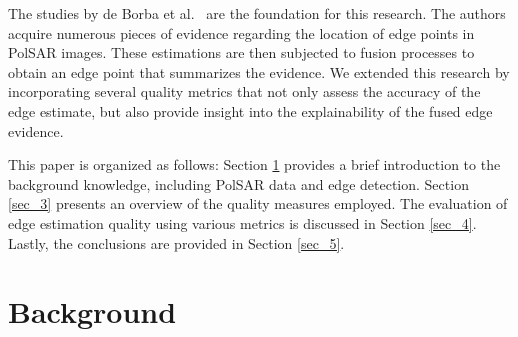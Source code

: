 \documentclass{article}
\begin{document}
The studies by de Borba et al.~\cite{DeBorba2020,FeatureSelectionforEdgeDetectioninPolSARImages} are the foundation for this research. The authors acquire numerous pieces of evidence regarding the location of edge points in PolSAR images. These estimations are then subjected to fusion processes to obtain an edge point that summarizes the evidence.
We extended this research by incorporating several quality metrics that not only assess the accuracy of the edge estimate, but also provide insight into the explainability of the fused edge evidence.

This paper is organized as follows:
Section \ref{sec_2} provides a brief introduction to the background knowledge, including PolSAR data and edge detection. Section \ref{sec_3} presents an overview of the quality measures employed. The evaluation of edge estimation quality using various metrics is discussed in Section \ref{sec_4}. Lastly, the conclusions are provided in Section \ref{sec_5}.


\section{Background}\label{sec_2}
\vspace{-0.2cm}
\end{document}
